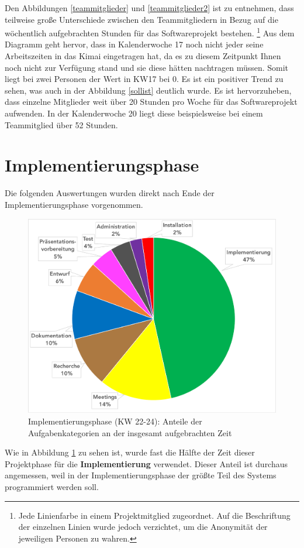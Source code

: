 \documentclass[../review_3.tex]{subfiles}
\begin{document}
Den Abbildungen \ref{teammitglieder} und \ref{teammitglieder2} ist zu entnehmen, dass teilweise große Unterschiede zwischen den Teammitgliedern in Bezug auf die wöchentlich aufgebrachten Stunden für das Softwareprojekt bestehen. \footnote{\noindent Jede Linienfarbe in einem Projektmitglied zugeordnet. Auf die Beschriftung der einzelnen Linien wurde jedoch verzichtet, um die Anonymität der jeweiligen Personen zu wahren.}
Aus dem Diagramm geht hervor, dass in Kalenderwoche 17 noch nicht jeder seine Arbeitszeiten in das Kimai eingetragen hat, da es zu diesem Zeitpunkt Ihnen noch nicht zur Verfügung stand und sie diese hätten nachtragen müssen. Somit liegt bei zwei Personen der Wert in KW17 bei 0.
Es ist ein positiver Trend zu sehen, was auch in der Abbildung \ref{sollist} deutlich wurde.
Es ist hervorzuheben, dass einzelne Mitglieder weit über 20 Stunden pro Woche für das Softwareprojekt aufwenden. In der Kalenderwoche 20 liegt diese beispielsweise bei einem Teammitglied über 52 Stunden.


\section{Implementierungsphase}

Die folgenden Auswertungen wurden direkt nach Ende der Implementierungsphase vorgenommen.

\begin{figure} [h]
    \centering
    \includegraphics[width = 0.8\linewidth]{img/kimai5.pdf}
    \caption{Implementierungsphase (KW 22-24): Anteile der Aufgabenkategorien an der insgesamt aufgebrachten Zeit}
    \label{kimai5}
\end{figure}
Wie in Abbildung \ref{kimai5} zu sehen ist, wurde fast die Hälfte der Zeit dieser Projektphase für die \textbf{Implementierung} verwendet. Dieser Anteil ist durchaus angemessen, weil in der Implementierungsphase der größte Teil des Systems programmiert werden soll.
\end{document}
